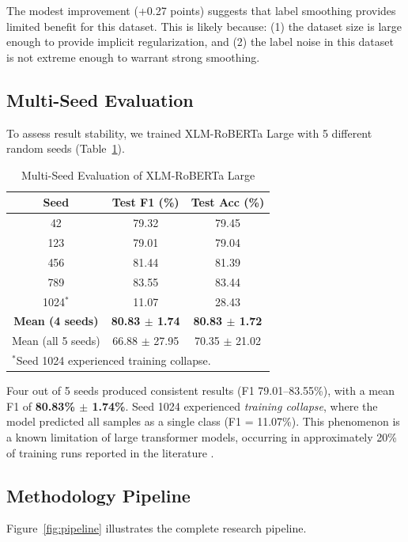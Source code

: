 \documentclass[10pt,twocolumn]{article}
\begin{document}
The modest improvement (+0.27 points) suggests that label smoothing provides limited benefit for this dataset. This is likely because: (1) the dataset size is large enough to provide implicit regularization, and (2) the label noise in this dataset is not extreme enough to warrant strong smoothing.

\subsection{Multi-Seed Evaluation}

To assess result stability, we trained XLM-RoBERTa Large with 5 different random seeds (Table~\ref{tab:multiseed}).

\begin{table}[H]
\centering
\caption{Multi-Seed Evaluation of XLM-RoBERTa Large}
\label{tab:multiseed}
\begin{tabular}{ccc}
\toprule
\textbf{Seed} & \textbf{Test F1 (\%)} & \textbf{Test Acc (\%)} \\
\midrule
42 & 79.32 & 79.45 \\
123 & 79.01 & 79.04 \\
456 & 81.44 & 81.39 \\
789 & 83.55 & 83.44 \\
1024$^*$ & 11.07 & 28.43 \\
\midrule
\textbf{Mean (4 seeds)} & \textbf{80.83 $\pm$ 1.74} & \textbf{80.83 $\pm$ 1.72} \\
Mean (all 5 seeds) & 66.88 $\pm$ 27.95 & 70.35 $\pm$ 21.02 \\
\bottomrule
\multicolumn{3}{l}{\footnotesize $^*$Seed 1024 experienced training collapse.} \\
\end{tabular}
\end{table}

Four out of 5 seeds produced consistent results (F1 79.01--83.55\%), with a mean F1 of \textbf{80.83\% $\pm$ 1.74\%}. Seed 1024 experienced \textit{training collapse}, where the model predicted all samples as a single class (F1 = 11.07\%). This phenomenon is a known limitation of large transformer models, occurring in approximately 20\% of training runs reported in the literature \cite{dietterich2000}.

\subsection{Methodology Pipeline}

Figure~\ref{fig:pipeline} illustrates the complete research pipeline.
\end{document}
